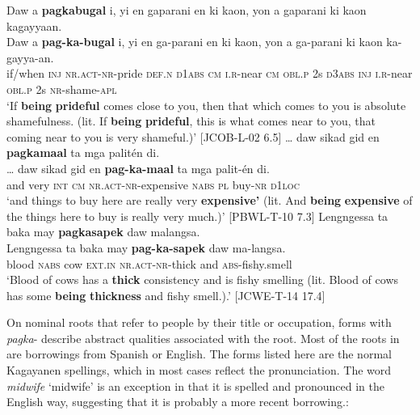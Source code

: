 \ea
Daw  a  \textbf{pagkabugal}  i,  yi  en  gaparani  en ki  kaon,  yon  a  gaparani  ki  kaon  kagayyaan. \\\smallskip
 \gll Daw  a  \textbf{pag-ka-bugal}  i,  yi  en  ga-parani  en ki  kaon,  yon  a  ga-parani  ki  kaon  ka-gayya-an. \\
if/when  \textsc{inj}  \textsc{nr.act-nr}-pride  \textsc{def.n}  \textsc{d1abs}  \textsc{cm}  \textsc{i.r-}near  \textsc{cm} \textsc{obl.p}  2s  \textsc{d3abs}  \textsc{inj}  \textsc{i.r}-near  \textsc{obl.p}  2s  \textsc{nr}-shame-\textsc{apl} \\
\glt `If \textbf{being} \textbf{prideful} comes close to you, then that which comes to you is absolute shamefulness. (lit. If \textbf{being} \textbf{prideful}, this is what comes near to you, that coming near to you is very shameful.)’ [JCOB-L-02 6.5]
\z
\ea
… daw  sikad  gid  en  \textbf{pagkamaal}  ta  mga  palitén  di. \\\smallskip
 \gll … daw  sikad  gid  en  \textbf{pag-ka-maal}  ta  mga  palit-én  di. \\
{} and  very  \textsc{int}  \textsc{cm}  \textsc{nr.act-nr}-expensive  \textsc{nabs}  \textsc{pl}  buy-\textsc{nr}  \textsc{d}1\textsc{loc} \\
\glt ‘and things to buy here are really very \textbf{expensive’} (lit. And \textbf{being} \textbf{expensive} of the things here to buy is really very much.)’ [PBWL-T-10 7.3]
\z
\ea
Lengngessa  ta  baka  may  \textbf{pagkasapek}  daw  malangsa. \\\smallskip
 \gll Lengngessa  ta  baka  may  \textbf{pag-ka-sapek}  daw  ma-langsa. \\
blood  \textsc{nabs}  cow  \textsc{ext.in}  \textsc{nr.act-nr}-thick  and  \textsc{abs}-fishy.smell \\
\glt ‘Blood of cows has a \textbf{thick} consistency and is fishy smelling (lit. Blood of cows has some \textbf{being} \textbf{thickness} and fishy smell.).' [JCWE-T-14 17.4]
\z

On nominal roots that refer to people by their title or occupation, forms with \textit{pagka}{}- describe abstract qualities associated with the root. Most of the roots in  are borrowings from Spanish or English. The forms listed here are the normal Kagayanen spellings, which in most cases reflect the pronunciation. The word \textit{midwife} ‘midwife’ is an exception in that it is spelled and pronounced in the English way, suggesting that it is probably a more recent borrowing.:

